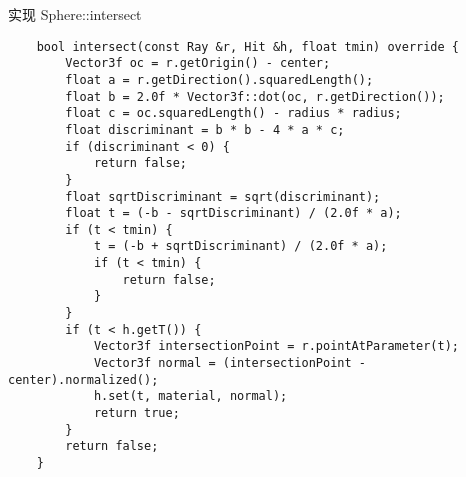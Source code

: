 \documentclass[a4paper,twoside]{article}
\begin{document}
\begin{listing}[H]
    \caption{实现 Sphere::intersect}
    \label{code:sphere_intersect}
    \begin{verbatim}
    bool intersect(const Ray &r, Hit &h, float tmin) override {
        Vector3f oc = r.getOrigin() - center;
        float a = r.getDirection().squaredLength();
        float b = 2.0f * Vector3f::dot(oc, r.getDirection());
        float c = oc.squaredLength() - radius * radius;
        float discriminant = b * b - 4 * a * c;
        if (discriminant < 0) {
            return false;
        }
        float sqrtDiscriminant = sqrt(discriminant);
        float t = (-b - sqrtDiscriminant) / (2.0f * a);
        if (t < tmin) {
            t = (-b + sqrtDiscriminant) / (2.0f * a);
            if (t < tmin) {
                return false;
            }
        }
        if (t < h.getT()) {
            Vector3f intersectionPoint = r.pointAtParameter(t);
            Vector3f normal = (intersectionPoint - center).normalized();
            h.set(t, material, normal);
            return true;
        }
        return false;
    }
    \end{verbatim}
\end{listing}
\end{document}
